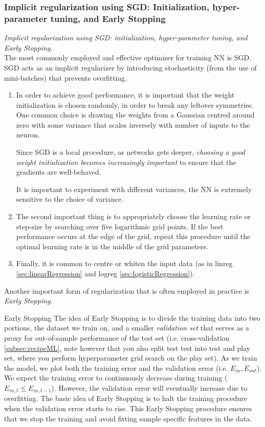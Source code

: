 \subsubsection{Implicit regularization using SGD: Initialization, hyper-parameter tuning, and Early Stopping}
\label{subsubsec:dnnRegularizingPracticalSGDEarlyStopping}
\emph{Implicit regularization using SGD: initialization, hyper-parameter tuning, and Early Stopping}.\\
	The most commonly employed and effective optimizer for training NN is SGD. SGD acts as an implicit regularizer by introducing stochasticity (from the use of mini-batches) that prevents overfitting. 
	\begin{enumerate} 
	\item In order to achieve good performance, it is important that the weight initialization is chosen randomly, in order to break any leftover symmetries. One common choice is drawing the weights from a Gaussian centred around zero with some variance that scales inversely with number of inputs to the neuron. 
	\begin{mybox}{}
		Since SGD is a local procedure, as networks gets deeper, \emph{choosing a good weight initialization becomes increasingly important} to ensure that the gradients are well-behaved.
	\end{mybox}
It is important to experiment with different variances, the NN is extremely sensitive to the choice of variance.
	\item The second important thing is to appropriately choose the learning rate or step-size by searching over five logarithmic grid points. If the best performance occurs at the edge of the grid, repeat this procedure until the optimal learning rate is in the middle of the grid parameters.
	\item Finally, it is common to centre or whiten the input data (as in linreg \ref{sec:linearRegression} and logreg \ref{sec:logisticRegression}).
\end{enumerate}
 Another important form of regularization that is often employed in practice is \emph{Early Stopping}.
\begin{mybox}{Early Stopping}
	The idea of Early Stopping is to divide the training data into two portions, the dataset we train on, and a smaller \emph{validation set} that serves as a proxy for out-of-sample performance of the test set (i.e. cross-validation \ref{subsec:recipeML}, note however that you also split test test into test and play set, where you perform hyperparameter grid search on the play set). As we train the model, we plot both the training error and the validation error (i.e. $E_{in}, E_{out}$). We expect the training error to continuously decrease during training ($E_{in, t} \leq E_{in,t-1}$). However, the validation error will eventually increase due to overfitting. The basic idea of Early Stopping is to halt the training procedure when the validation error starts to rise. This Early Stopping procedure ensures that we stop the training and avoid fitting sample specific features in the data.
\end{mybox}
